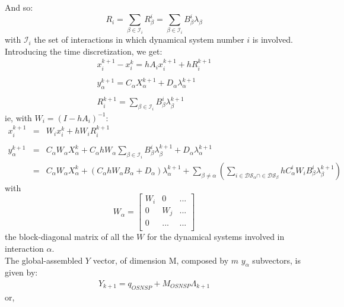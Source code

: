 \documentclass[10pt]{report}
\begin{document}
And so: 
\begin{equation}
R_i = \sum_{\beta\in\mathcal{I}_i}R_{\beta}^i=\sum_{\beta\in\mathcal{I}_i}B^i_{\beta} \lambda_{\beta}
\end{equation}
with $\mathcal{I}_i$ the set of interactions in which dynamical system number $i$ is involved. \\
Introducing the time discretization, we get: 
\begin{eqnarray}
x_i^{k+1}-x_i^k = h A_i x_i^{k+1} + h R_i^{k+1}  \\
\nonumber\\
y_{\alpha}^{k+1} = C_{\alpha}X_{\alpha}^{k+1} + D_{\alpha}\lambda_{\alpha}^{k+1}\\
\nonumber\\
R_i^{k+1} = \sum_{\beta\in\mathcal{I}_i}B^i_{\beta} \lambda_{\beta}^{k+1}
\end{eqnarray}
ie, with $W_i = (I-h A_i)^{-1}$: 
\begin{eqnarray}
x_i^{k+1}&=& W_i x_i^{k} + hW_i R_i^{k+1}  \\
\nonumber\\
y_{\alpha}^{k+1} &=& C_{\alpha}W_{\alpha} X_{\alpha}^{k} + C_{\alpha}hW_{\alpha}\sum_{\beta\in\mathcal{I}_i}B^i_{\beta} \lambda_{\beta}^{k+1} + D_{\alpha}\lambda_{\alpha}^{k+1} \\
&=& C_{\alpha}W_{\alpha} X_{\alpha}^{k} + (C_{\alpha}hW_{\alpha}B_{\alpha} + D_{\alpha}) \lambda_{\alpha}^{k+1} + \sum_{\beta\neq\alpha}(\sum_{i\in\mathcal{DS}_{\alpha}\cap\in\mathcal{DS}_{\beta}} hC_{\alpha}^iW_i B^i_{\beta} \lambda_{\beta}^{k+1})
\end{eqnarray}
with 
\begin{equation}\label{Walpha}
W_{\alpha}=\left[\begin{array}{ccc} 
W_i &  0   & ... \\
0   &  W_j & ...\\
0  & ... & ... \\ 
\end{array}\right]
\end{equation}
the block-diagonal matrix of all the $W$ for the dynamical systems involved in interaction $\alpha$.\\  
The global-assembled $Y$ vector, of dimension M, composed by $m$ $y_{\alpha}$ subvectors, is given by:
\begin{eqnarray}
Y_{k+1} = q_{OSNSP} + M_{OSNSP}\Lambda_{k+1}
\end{eqnarray}
or,
\end{document}

